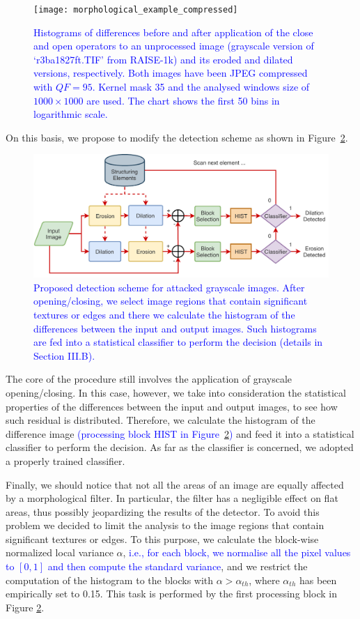 \documentclass{ieeeaccess}
\newcommand{\revisedtext}[1]{\textcolor{blue}{#1}}
\begin{document}
\begin{figure}[!ht]%
	\centering
	\texttt{[image: morphological\_example\_compressed]}
	\caption{\revisedtext{Histograms of differences before and after application of the close and open operators to an unprocessed image (grayscale version of `r3ba1827ft.TIF' from RAISE-1k) and its eroded and dilated versions, respectively. Both images have been JPEG compressed with $QF = 95$. Kernel mask 35 and the analysed windows size of $1000 \times 1000$ are used. The chart shows the first 50 bins in logarithmic scale. }}
	\label{fig:differerence_histogram}
\end{figure}

On this basis, we propose to modify the detection scheme as shown in Figure~\ref{fig:scheme_improved}.
\begin{figure}[!ht]
	\centering
	\includegraphics[width=0.7\linewidth]{diagram2}
	\caption{\revisedtext{Proposed detection scheme for attacked grayscale images. After opening/closing, we select image regions that contain significant textures or edges and there we calculate the histogram of the differences between the input and output images. Such histograms are fed into a statistical classifier to perform the decision (details in  Section III.B).}} 
	\label{fig:scheme_improved}
\end{figure}
The core of the procedure still involves the application of grayscale opening/closing. In this case, however, we take into consideration the statistical properties of the differences between the input and output images, to see how such residual is distributed. Therefore, we calculate the histogram of the difference image \revisedtext{(processing block HIST in Figure~\ref{fig:scheme_improved})} and feed it into a statistical classifier to perform the decision. As far as the classifier is concerned, we adopted a properly trained classifier. 

Finally, we should notice that not all the areas of an image are equally affected by a morphological filter. In particular, the filter has a negligible effect on flat areas, thus possibly jeopardizing the results of the detector. To avoid this problem we decided to limit the analysis to the image regions that contain significant textures or edges. To this purpose, we calculate the block-wise normalized local variance $\alpha$, 
%
\revisedtext{i.e., for each block, we normalise all the pixel values to $[0, 1]$ and then compute the standard variance}, and we restrict the computation of the histogram to the blocks with $\alpha > \alpha_{th}$, where $\alpha_{th}$ has been empirically set to 0.15. This task is performed by the first processing block in Figure \ref{fig:scheme_improved}. 
\end{document}

